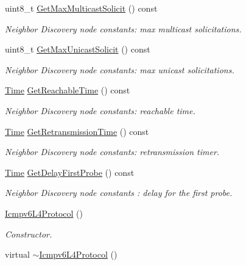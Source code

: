 \begin{DoxyCompactItemize}
\item 
uint8\+\_\+t \hyperlink{classns3_1_1Icmpv6L4Protocol_abb4118285596e2a14fd32270b34025da}{Get\+Max\+Multicast\+Solicit} () const 
\begin{DoxyCompactList}\small\item\em Neighbor Discovery node constants\+: max multicast solicitations. \end{DoxyCompactList}\item 
uint8\+\_\+t \hyperlink{classns3_1_1Icmpv6L4Protocol_a6e9aed5e1a7770899a458b65f00ef62f}{Get\+Max\+Unicast\+Solicit} () const 
\begin{DoxyCompactList}\small\item\em Neighbor Discovery node constants\+: max unicast solicitations. \end{DoxyCompactList}\item 
\hyperlink{classns3_1_1Time}{Time} \hyperlink{classns3_1_1Icmpv6L4Protocol_a5fb975cf28febe9997ee704d89bdd9fb}{Get\+Reachable\+Time} () const 
\begin{DoxyCompactList}\small\item\em Neighbor Discovery node constants\+: reachable time. \end{DoxyCompactList}\item 
\hyperlink{classns3_1_1Time}{Time} \hyperlink{classns3_1_1Icmpv6L4Protocol_ad756130c71199a72cf34336fea7f4541}{Get\+Retransmission\+Time} () const 
\begin{DoxyCompactList}\small\item\em Neighbor Discovery node constants\+: retransmission timer. \end{DoxyCompactList}\item 
\hyperlink{classns3_1_1Time}{Time} \hyperlink{classns3_1_1Icmpv6L4Protocol_af9f99267d950310856adcde5a37da210}{Get\+Delay\+First\+Probe} () const 
\begin{DoxyCompactList}\small\item\em Neighbor Discovery node constants \+: delay for the first probe. \end{DoxyCompactList}\item 
\hyperlink{classns3_1_1Icmpv6L4Protocol_accdeaa226eb8d84ef23a96e60881f3de}{Icmpv6\+L4\+Protocol} ()
\begin{DoxyCompactList}\small\item\em Constructor. \end{DoxyCompactList}\item 
virtual \hyperlink{classns3_1_1Icmpv6L4Protocol_aad392a1007a7d6b775654c9829389b26}{$\sim$\+Icmpv6\+L4\+Protocol} ()

\end{DoxyCompactItemize}
